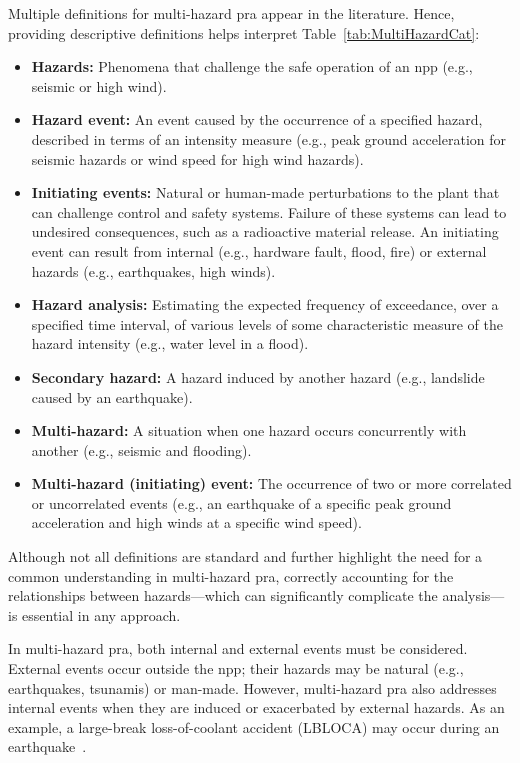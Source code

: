 Multiple definitions for multi-hazard \acrshort{pra} appear in the literature. Hence, providing descriptive definitions helps interpret Table~\ref{tab:MultiHazardCat}:

\begin{itemize}
\item \textbf{Hazards:} Phenomena that challenge the safe operation of an \acrshort{npp} (e.g., seismic or high wind).
\item \textbf{Hazard event:} An event caused by the occurrence of a specified hazard, described in terms of an intensity measure (e.g., peak ground acceleration for seismic hazards or wind speed for high wind hazards).
\item \textbf{Initiating events:} Natural or human-made perturbations to the plant that can challenge control and safety systems. Failure of these systems can lead to undesired consequences, such as a radioactive material release. An initiating event can result from internal (e.g., hardware fault, flood, fire) or external hazards (e.g., earthquakes, high winds).
\item \textbf{Hazard analysis:} Estimating the expected frequency of exceedance, over a specified time interval, of various levels of some characteristic measure of the hazard intensity (e.g., water level in a flood).
\item \textbf{Secondary hazard:} A hazard induced by another hazard (e.g., landslide caused by an earthquake).
\item \textbf{Multi-hazard:} A situation when one hazard occurs concurrently with another (e.g., seismic and flooding).
\item \textbf{Multi-hazard (initiating) event:} The occurrence of two or more correlated or uncorrelated events (e.g., an earthquake of a specific peak ground acceleration and high winds at a specific wind speed).
\end{itemize}

Although not all definitions are standard and further highlight the need for a common understanding in multi-hazard \acrshort{pra}, correctly accounting for the relationships between hazards---which can significantly complicate the analysis---is essential in any approach.

In multi-hazard \acrshort{pra}, both internal and external events must be considered. External events occur outside the \acrshort{npp}; their hazards may be natural (e.g., earthquakes, tsunamis) or man-made. However, multi-hazard \acrshort{pra} also addresses internal events when they are induced or exacerbated by external hazards. As an example, a large-break loss-of-coolant accident (LBLOCA) may occur during an earthquake~\cite{53}.

